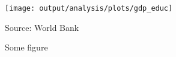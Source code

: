\begin{figure}
\caption{Some figure\label{fig:gdp_educ}}

\begin{centering}
\medskip{}
\par\end{centering}
\begin{centering}
\texttt{[image: output/analysis/plots/gdp\_educ]}\medskip{}
\par\end{centering}
{\footnotesize{}Source: World Bank}{\footnotesize\par}
\end{figure}

